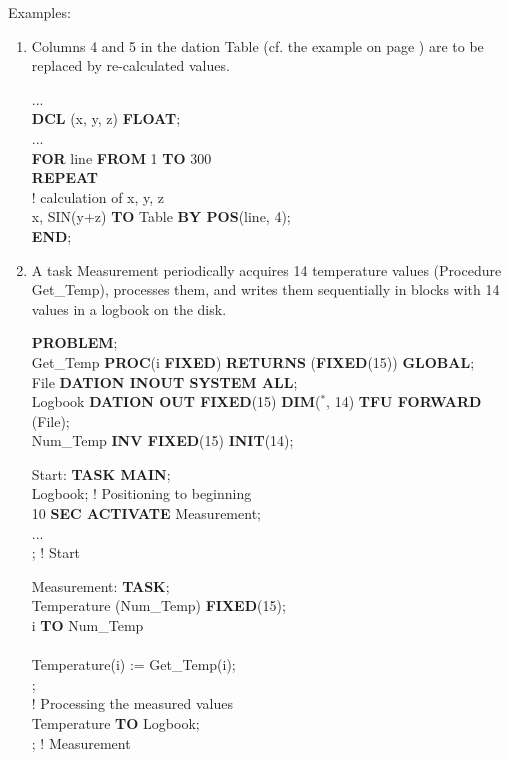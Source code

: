 Examples:

\begin{enumerate}
\item Columns 4 and 5 in the dation Table (cf. the example on page
\pageref{Example}) are to be replaced by re-calculated values.

...\\
{\bf DCL} (x, y, z) {\bf FLOAT};\\
...\\
{\bf FOR} line {\bf FROM} 1 {\bf TO} 300\\
{\bf REPEAT}\\
\x ! calculation of x, y, z\\
 x, SIN(y+z) {\bf TO} Table {\bf BY POS}(line, 4);\\
{\bf END};

\item A task Measurement periodically acquires 14 temperature values
(Procedure Get\_Temp), processes them, and writes them sequentially in
blocks with 14 values in a logbook on the disk.

{\bf PROBLEM};\\
 Get\_Temp {\bf PROC}(i {\bf FIXED}) {\bf RETURNS} ({\bf FIXED}(15)) {\bf GLOBAL};\\
 File {\bf DATION INOUT SYSTEM ALL};\\
 Logbook {\bf DATION OUT FIXED}(15) {\bf DIM}($^*$, 14) {\bf TFU FORWARD}\\
\x {} (File);\\
 Num\_Temp {\bf INV FIXED}(15) {\bf INIT}(14);

Start: {\bf TASK MAIN};\\
 Logbook; \x ! Positioning to beginning\\
 10 {\bf SEC ACTIVATE} Measurement;\\
\x ... \\
; ! Start

Measurement: {\bf TASK};\\
 Temperature (Num\_Temp) {\bf FIXED}(15); \\
 i {\bf TO} Num\_Temp\\
\\
\x \x Temperature(i) := Get\_Temp(i);\\
;\\
\x ! Processing the measured values\\
 Temperature {\bf TO} Logbook; \\
; ! Measurement
\end{enumerate}

